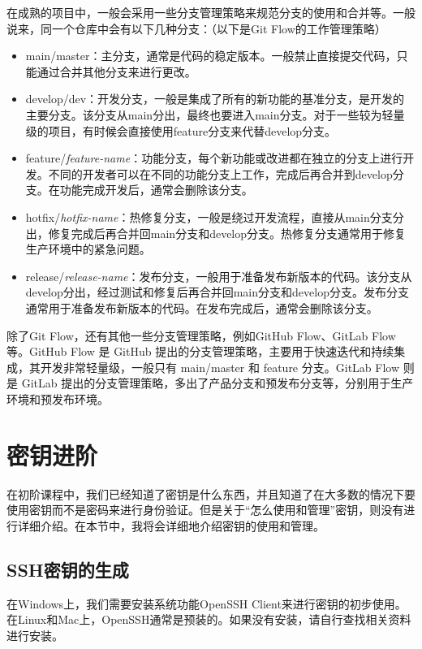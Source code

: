 \documentclass[../main.tex]{subfiles}
\begin{document}
在成熟的项目中，一般会采用一些分支管理策略来规范分支的使用和合并等。一般说来，同一个仓库中会有以下几种分支：（以下是Git Flow的工作管理策略）
\begin{itemize}
  \item main/master：主分支，通常是代码的稳定版本。一般禁止直接提交代码，只能通过合并其他分支来进行更改。
  \item develop/dev：开发分支，一般是集成了所有的新功能的基准分支，是开发的主要分支。该分支从main分出，最终也要进入main分支。对于一些较为轻量级的项目，有时候会直接使用feature分支来代替develop分支。
  \item feature/\textit{feature-name}：功能分支，每个新功能或改进都在独立的分支上进行开发。不同的开发者可以在不同的功能分支上工作，完成后再合并到develop分支。在功能完成开发后，通常会删除该分支。
  \item hotfix/\textit{hotfix-name}：热修复分支，一般是绕过开发流程，直接从main分支分出，修复完成后再合并回main分支和develop分支。热修复分支通常用于修复生产环境中的紧急问题。
  \item release/\textit{release-name}：发布分支，一般用于准备发布新版本的代码。该分支从develop分出，经过测试和修复后再合并回main分支和develop分支。发布分支通常用于准备发布新版本的代码。在发布完成后，通常会删除该分支。
\end{itemize}

除了Git Flow，还有其他一些分支管理策略，例如GitHub Flow、GitLab Flow等。GitHub Flow 是 GitHub 提出的分支管理策略，主要用于快速迭代和持续集成，其开发非常轻量级，一般只有 main/master 和 feature 分支。GitLab Flow 则是 GitLab 提出的分支管理策略，多出了产品分支和预发布分支等，分别用于生产环境和预发布环境。

\section{密钥进阶}

在初阶课程中，我们已经知道了密钥是什么东西，并且知道了在大多数的情况下要使用密钥而不是密码来进行身份验证。但是关于“怎么使用和管理”密钥，则没有进行详细介绍。在本节中，我将会详细地介绍密钥的使用和管理。

\subsection{SSH密钥的生成}

在Windows上，我们需要安装系统功能OpenSSH Client来进行密钥的初步使用。在Linux和Mac上，OpenSSH通常是预装的。如果没有安装，请自行查找相关资料进行安装。
\end{document}
